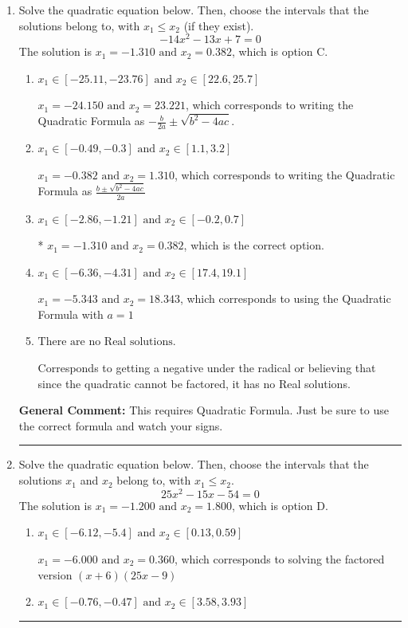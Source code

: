 \documentclass{extbook}[14pt]
\newcommand{\litem}[1]{\item #1

\rule{\textwidth}{0.4pt}}
\begin{document}
\begin{enumerate}\litem{
Solve the quadratic equation below. Then, choose the intervals that the solutions belong to, with $x_1 \leq x_2$ (if they exist).
\[ -14x^{2} -13 x + 7 = 0 \]The solution is \( x_1 = -1.310 \text{ and } x_2 = 0.382 \), which is option C.\begin{enumerate}[label=\Alph*.]
\item \( x_1 \in [-25.11, -23.76] \text{ and } x_2 \in [22.6, 25.7] \)

 $x_1 = -24.150 \text{ and } x_2 = 23.221$, which corresponds to writing the Quadratic Formula as $-\frac{b}{2a} \pm \sqrt{b^2 - 4ac}$.
\item \( x_1 \in [-0.49, -0.3] \text{ and } x_2 \in [1.1, 3.2] \)

 $x_1 = -0.382 \text{ and } x_2 = 1.310$, which corresponds to writing the Quadratic Formula as $\frac{b \pm \sqrt{b^2 - 4ac}}{2a}$
\item \( x_1 \in [-2.86, -1.21] \text{ and } x_2 \in [-0.2, 0.7] \)

* $x_1 = -1.310 \text{ and } x_2 = 0.382$, which is the correct option.
\item \( x_1 \in [-6.36, -4.31] \text{ and } x_2 \in [17.4, 19.1] \)

 $x_1 = -5.343 \text{ and } x_2 = 18.343$, which corresponds to using the Quadratic Formula with $a=1$
\item \( \text{There are no Real solutions.} \)

Corresponds to getting a negative under the radical or believing that since the quadratic cannot be factored, it has no Real solutions.
\end{enumerate}

\textbf{General Comment:} This requires Quadratic Formula. Just be sure to use the correct formula and watch your signs.
}
\litem{
Solve the quadratic equation below. Then, choose the intervals that the solutions $x_1$ and $x_2$ belong to, with $x_1 \leq x_2$.
\[ 25x^{2} -15 x -54 = 0 \]The solution is \( x_1 = -1.200 \text{ and } x_2 = 1.800 \), which is option D.\begin{enumerate}[label=\Alph*.]
\item \( x_1 \in [-6.12, -5.4] \text{ and } x_2 \in [0.13, 0.59] \)

$x_1 = -6.000 \text{ and } x_2 = 0.360$, which corresponds to solving the factored version $(x + 6)(25x -9)$
\item \( x_1 \in [-0.76, -0.47] \text{ and } x_2 \in [3.58, 3.93] \)


\end{enumerate}}
\end{enumerate}
\end{document}
